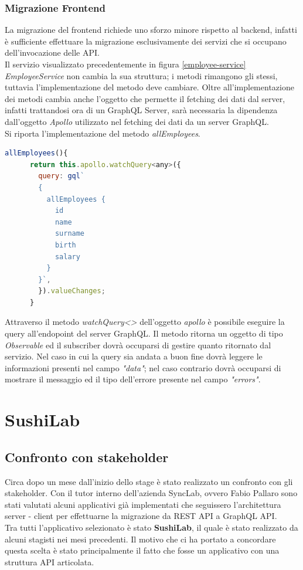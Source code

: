 \subsubsection*{Migrazione Frontend}
La migrazione del frontend richiede uno sforzo minore rispetto al backend, infatti è sufficiente effettuare la migrazione esclusivamente dei servizi che si occupano dell'invocazione delle API.\\
Il servizio visualizzato precedentemente in figura \ref{employee-service} \textit{EmployeeService} non cambia la sua struttura; i metodi rimangono gli stessi, tuttavia l'implementazione del metodo deve cambiare. Oltre all'implementazione dei metodi cambia anche l'oggetto che permette il fetching dei dati dal server, infatti trattandosi ora di un GraphQL Server, sarà necessaria la dipendenza dall'oggetto \textit{Apollo} utilizzato nel fetching dei dati da un server GraphQL.\\
Si riporta l'implementazione del metodo  \textit{allEmployees}.
\begin{lstlisting}[language=JavaScript, title={allEmployees()}]
  allEmployees(){
      return this.apollo.watchQuery<any>({
        query: gql`
        {
          allEmployees {
            id
            name
            surname
            birth
            salary
          }
        }`,
        }).valueChanges;
      }
\end{lstlisting}
Attraverso il metodo \textit{watchQuery<>} dell'oggetto \textit{apollo} è possibile eseguire la query all'endopoint del server GraphQL. Il metodo ritorna un oggetto di tipo \textit{Observable} ed il subscriber dovrà occuparsi di gestire quanto ritornato dal servizio. Nel caso in cui la query sia andata a buon fine dovrà leggere le informazioni presenti nel campo \textit{"data"}; nel caso contrario dovrà occuparsi di mostrare il messaggio ed il tipo dell'errore presente nel campo \textit{"errors"}.
\section{SushiLab}
\label{sushi-lab}
\subsection{Confronto con stakeholder}
Circa dopo un mese dall'inizio dello stage è stato realizzato un confronto con gli stakeholder. Con il tutor interno dell'azienda SyncLab, ovvero Fabio Pallaro sono stati valutati alcuni applicativi già implementati che seguissero l'architettura server - client per effettuarne la migrazione da REST API a GraphQL API.\\
Tra tutti l'applicativo selezionato è stato \textbf{SushiLab}, il quale è stato realizzato da alcuni stagisti nei mesi precedenti. Il motivo che ci ha portato a concordare questa scelta è stato principalmente il fatto che fosse un applicativo con una struttura API articolata.
